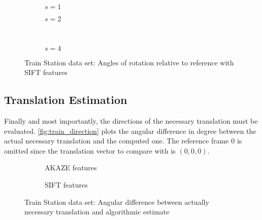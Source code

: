 \begin{figure}
   \begin{subfigure}{.5\linewidth}
      \centering      
      
      \caption{$s=1$}
      \label{fig:train_SIFT_rotation_1}
   \end{subfigure}
   \quad
   \begin{subfigure}{.5\linewidth}
      \centering      
      
      \caption{$s=2$}
      \label{fig:train_SIFT_rotation_2}
   \end{subfigure}\\[3ex]
   \begin{subfigure}{\linewidth}
      \centering      
      
      \caption{$s=4$}
      \label{fig:train_SIFT_rotation_4}
   \end{subfigure}
   \caption[Train data: Rotation SIFT]{Train Station data set: Angles of rotation relative to reference with SIFT features}
   \label{fig:train_rotation_SIFT}
\end{figure}

\subsection{Translation Estimation}

Finally and most importantly, the directions of the necessary translation must
be evaluated. \autoref{fig:train_direction} plots the angular difference in
degree between the actual necessary translation and the computed one. The
reference frame $0$ is omitted since the translation vector to compare with is
$(0,0,0)$.

\begin{figure}
   \begin{subfigure}[b]{.5\linewidth}
      \centering      
      
      \caption{AKAZE features}
      \label{fig:train_KAZE_direction}
   \end{subfigure}
   \begin{subfigure}[b]{.5\linewidth}
      \centering      
      
      \caption{SIFT features}
      \label{fig:train_SIFT_direction}
   \end{subfigure}
   \caption[Train data: Translation]{Train Station data set: Angular difference between actually necessary translation and algorithmic estimate}
   \label{fig:train_direction}
\end{figure}

